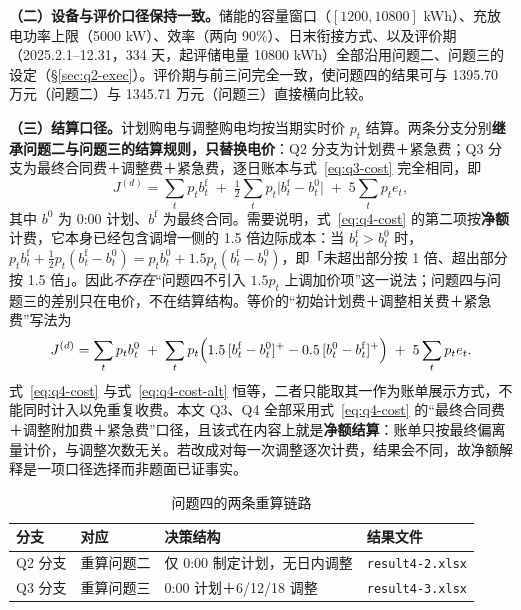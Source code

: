\textbf{（二）设备与评价口径保持一致。}储能的容量窗口（$[1200,10800]$ kWh）、充放电功率上限（5000 kW）、效率（两向 90\%）、日末衔接方式、以及评价期（2025.2.1--12.31，334 天，起评储电量 10800 kWh）全部沿用问题二、问题三的设定（\S\ref{sec:q2-exec}）。评价期与前三问完全一致，使问题四的结果可与 1395.70 万元（问题二）与 1345.71 万元（问题三）直接横向比较。

\textbf{（三）结算口径。}计划购电与调整购电均按当期实时价 $p_t$ 结算。两条分支分别\textbf{继承问题二与问题三的结算规则，只替换电价}：Q2 分支为计划费＋紧急费；Q3 分支为最终合同费＋调整费＋紧急费，逐日账本与式~\eqref{eq:q3-cost} 完全相同，即
\begin{equation}
  J^{(d)}=\sum_t p_t b^{\mathrm f}_t
  \;+\;\tfrac12\sum_t p_t\bigl|b^{\mathrm f}_t-b^{0}_t\bigr|
  \;+\;5\sum_t p_t e_t ,
  \label{eq:q4-cost}
\end{equation}
其中 $b^{0}$ 为 0:00 计划、$b^{\mathrm f}$ 为最终合同。需要说明，式~\eqref{eq:q4-cost} 的第二项按\textbf{净额}计费，它本身已经包含调增一侧的 1.5 倍边际成本：当 $b^{\mathrm f}_t>b^{0}_t$ 时，$p_tb^{\mathrm f}_t+\tfrac12p_t(b^{\mathrm f}_t-b^{0}_t)=p_tb^{0}_t+1.5p_t(b^{\mathrm f}_t-b^{0}_t)$，即「未超出部分按 1 倍、超出部分按 1.5 倍」。因此\emph{不存在}``问题四不引入 $1.5p_t$ 上调加价项''这一说法；问题四与问题三的差别只在电价，不在结算结构。等价的``初始计划费＋调整相关费＋紧急费''写法为
\begin{equation}
  J^{(d)}=\sum_t p_t b^{0}_t
  \;+\;\sum_t p_t\Bigl(1.5\,[b^{\mathrm f}_t-b^{0}_t]^+-0.5\,[b^{0}_t-b^{\mathrm f}_t]^+\Bigr)
  \;+\;5\sum_t p_t e_t .
  \label{eq:q4-cost-alt}
\end{equation}
式~\eqref{eq:q4-cost} 与式~\eqref{eq:q4-cost-alt} 恒等，二者只能取其一作为账单展示方式，不能同时计入以免重复收费。本文 Q3、Q4 全部采用式~\eqref{eq:q4-cost} 的``最终合同费＋调整附加费＋紧急费''口径，且该式在内容上就是\textbf{净额结算}：账单只按最终偏离量计价，与调整次数无关。若改成对每一次调整逐次计费，结果会不同，故净额解释是一项口径选择而非题面已证事实。

\begin{table}[H]
  \centering
  \caption{问题四的两条重算链路}
  \label{tab:q4-branches}
  \begin{tabular}{llll}
    \toprule
    分支 & 对应 & 决策结构 & 结果文件 \\
    \midrule
    Q2 分支 & 重算问题二 & 仅 0:00 制定计划，无日内调整 & \texttt{result4-2.xlsx} \\
    Q3 分支 & 重算问题三 & 0:00 计划＋6/12/18 调整 & \texttt{result4-3.xlsx} \\
    \bottomrule
  \end{tabular}
\end{table}

